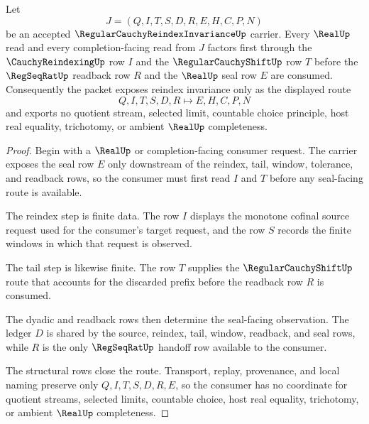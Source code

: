 \begin{theorem}
\label{thm:regular-cauchy-reindex-invariance-real-seal-handoff}
Let
$$
J=(Q,I,T,S,D,R,E,H,C,P,N)
$$
be an accepted $\RegularCauchyReindexInvarianceUp$ carrier. Every $\RealUp$ read and every completion-facing read from $J$ factors first through the $\CauchyReindexingUp$ row $I$ and the $\RegularCauchyShiftUp$ row $T$ before the $\RegSeqRatUp$ readback row $R$ and the $\RealUp$ seal row $E$ are consumed. Consequently the packet exposes reindex invariance only as the displayed route
$$
Q,I,T,S,D,R \longmapsto E,H,C,P,N
$$
and exports no quotient stream, selected limit, countable choice principle, host real equality, trichotomy, or ambient $\RealUp$ completeness.
\end{theorem}
\begin{proof}
Begin with a $\RealUp$ or completion-facing consumer request. The carrier exposes the seal row $E$ only downstream of the reindex, tail, window, tolerance, and readback rows, so the consumer must first read $I$ and $T$ before any seal-facing route is available.

The reindex step is finite data. The row $I$ displays the monotone cofinal source request used for the consumer's target request, and the row $S$ records the finite windows in which that request is observed.

The tail step is likewise finite. The row $T$ supplies the $\RegularCauchyShiftUp$ route that accounts for the discarded prefix before the readback row $R$ is consumed.

The dyadic and readback rows then determine the seal-facing observation. The ledger $D$ is shared by the source, reindex, tail, window, readback, and seal rows, while $R$ is the only $\RegSeqRatUp$ handoff row available to the consumer.

The structural rows close the route. Transport, replay, provenance, and local naming preserve only $Q,I,T,S,D,R,E$, so the consumer has no coordinate for quotient streams, selected limits, countable choice, host real equality, trichotomy, or ambient $\RealUp$ completeness.
\end{proof}


